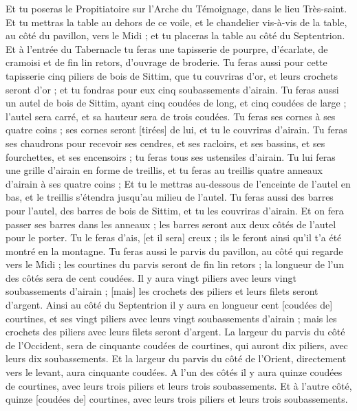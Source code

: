 \begin{multicols}{2}
Et tu poseras le Propitiatoire sur l'Arche du Témoignage, dans le lieu Très-saint.
Et tu mettras la table au dehors de ce voile, et le chandelier vis-à-vis de la table, au côté du pavillon, vers le Midi ; et tu placeras la table au côté du Septentrion.
Et à l'entrée du Tabernacle tu feras une tapisserie de pourpre, d'écarlate, de cramoisi et de fin lin retors, d'ouvrage de broderie.
Tu feras aussi pour cette tapisserie cinq piliers de bois de Sittim, que tu couvriras d'or, et leurs crochets seront d'or ; et tu fondras pour eux cinq soubassements d'airain.
\VerseOne{}Tu feras aussi un autel de bois de Sittim, ayant cinq coudées de long, et cinq coudées de large ; l'autel sera carré, et sa hauteur sera de trois coudées.
Tu feras ses cornes à ses quatre coins ; ses cornes seront [tirées] de lui, et tu le couvriras d'airain.
Tu feras ses chaudrons pour recevoir ses cendres, et ses racloirs, et ses bassins, et ses fourchettes, et ses encensoirs ; tu feras tous ses ustensiles d'airain.
Tu lui feras une grille d'airain en forme de treillis, et tu feras au treillis quatre anneaux d'airain à ses quatre coins ;
Et tu le mettras au-dessous de l'enceinte de l'autel en bas, et le treillis s'étendra jusqu'au milieu de l'autel.
Tu feras aussi des barres pour l'autel, des barres de bois de Sittim, et tu les couvriras d'airain.
Et on fera passer ses barres dans les anneaux ; les barres seront aux deux côtés de l'autel pour le porter.
Tu le feras d'ais, [et il sera] creux ; ils le feront ainsi qu'il t'a été montré en la montagne.
Tu feras aussi le parvis du pavillon, au côté qui regarde vers le Midi ; les courtines du parvis seront de fin lin retors ; la longueur de l'un des côtés sera de cent coudées.
Il y aura vingt piliers avec leurs vingt soubassements d'airain ; [mais] les crochets des piliers et leurs filets seront d'argent.
Ainsi au côté du Septentrion il y aura en longueur cent [coudées de] courtines, et ses vingt piliers avec leurs vingt soubassements d'airain ; mais les crochets des piliers avec leurs filets seront d'argent.
La largeur du parvis du côté de l'Occident, sera de cinquante coudées de courtines, qui auront dix piliers, avec leurs dix soubassements.
Et la largeur du parvis du côté de l'Orient, directement vers le levant, aura cinquante coudées.
A l'un des côtés il y aura quinze coudées de courtines, avec leurs trois piliers et leurs trois soubassements.
Et à l'autre côté, quinze [coudées de] courtines, avec leurs trois piliers et leurs trois soubassements.

\end{multicols}
